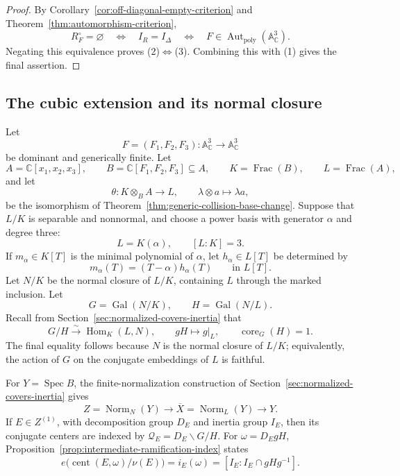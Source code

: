 \documentclass[11pt]{article}
\theoremstyle{remark}
\theoremstyle{definition}
\DeclareMathOperator{\Spec}{Spec}
\DeclareMathOperator{\Frac}{Frac}
\DeclareMathOperator{\Gal}{Gal}
\DeclareMathOperator{\Hom}{Hom}
\DeclareMathOperator{\Aut}{Aut}
\DeclareMathOperator{\Norm}{Norm}
\DeclareMathOperator{\core}{core}
\newcommand{\A}{\mathbb A}
\newcommand{\C}{\mathbb C}
\begin{document}
\begin{proof}
By Corollary~\ref{cor:off-diagonal-empty-criterion} and
Theorem~\ref{thm:automorphism-criterion},
\[
  R_F^\circ=\varnothing
  \quad\Longleftrightarrow\quad
  I_R=I_\Delta
  \quad\Longleftrightarrow\quad
  F\in\Aut_{\mathrm{poly}}(\A^3_{\C}).
\]
Negating this equivalence proves
\textup{(2)}\(\Longleftrightarrow\)\textup{(3)}.  Combining this with
\textup{(1)} gives the final assertion.
\end{proof}

\subsection{The cubic extension and its normal closure}
\label{sec:cubic-extension}

Let
\[
  F=(F_1,F_2,F_3)\colon\A^3_{\C}\longrightarrow\A^3_{\C}
\]
be dominant and generically finite.  Let
\[
  A=\C[x_1,x_2,x_3],
  \qquad
  B=\C[F_1,F_2,F_3]\subseteq A,
  \qquad
  K=\Frac(B),
  \qquad
  L=\Frac(A),
\]
and let
\[
  \theta\colon K\otimes_BA\longrightarrow L,
  \qquad
  \lambda\otimes a\longmapsto\lambda a,
\]
be the isomorphism of
Theorem~\ref{thm:generic-collision-base-change}.  Suppose that \(L/K\)
is separable and nonnormal, and
choose a power basis with generator \(\alpha\) and degree three:
\[
  L=K(\alpha),
  \qquad
  [L:K]=3.
\]
If \(m_\alpha\in K[T]\) is the minimal polynomial of \(\alpha\), let
\(h_\alpha\in L[T]\) be determined by
\[
  m_\alpha(T)=(T-\alpha)h_\alpha(T)
  \qquad\text{in }L[T].
\]
Let \(N/K\) be the normal closure of \(L/K\), containing \(L\) through
the marked inclusion.  Let
\[
  G=\Gal(N/K),
  \qquad
  H=\Gal(N/L).
\]
Recall from Section~\ref{sec:normalized-covers-inertia} that
\[
  G/H\xrightarrow{\sim}\Hom_K(L,N),
  \qquad
  gH\longmapsto g|_L,
  \qquad
  \core_G(H)=1.
\]
The final equality follows because \(N\) is the normal closure of
\(L/K\); equivalently, the action of \(G\) on the conjugate embeddings
of \(L\) is faithful.

For \(Y=\Spec B\), the finite-normalization construction of
Section~\ref{sec:normalized-covers-inertia} gives
\[
  Z=\Norm_N(Y)\longrightarrow
  \overline X=\Norm_L(Y)\longrightarrow Y.
\]
If \(E\in Z^{(1)}\), with decomposition group \(D_E\) and inertia group
\(I_E\), then its conjugate centers are indexed by
\(\mathcal Q_E=D_E\backslash G/H\).  For
\(\omega=D_EgH\), Proposition~\ref{prop:intermediate-ramification-index}
states
\[
  e\bigl(\operatorname{cent}(E,\omega)/\nu(E)\bigr)
  =
  i_E(\omega)
  =
  [I_E:I_E\cap gHg^{-1}].
\]
\end{document}
